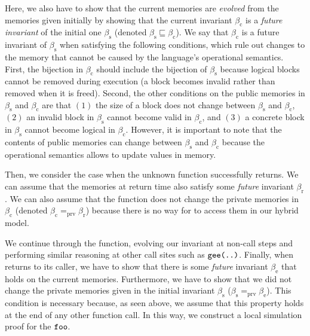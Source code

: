 Here, we also have to show that the current memories are
\emph{evolved} from the memories given initially by showing that the
current invariant $\beta_\textrm{c}$ is a \emph{future invariant} of
the initial one ${\beta_\textrm{s}}$ 
(denoted ${\beta_\textrm{s}}\sqsubseteq\beta_\textrm{c}$).
We say that $\beta_\textrm{c}$ is a future invariant of 
${\beta_\textrm{s}}$ when satisfying the following conditions,
which rule out changes to the memory that cannot be caused 
by the language's operational semantics.  
First, the bijection in
$\beta_\textrm{c}$ should include the bijection of ${\beta_\textrm{s}}$ because
logical blocks cannot be removed during execution (a block
becomes invalid rather than removed when it is freed).  Second, the other
conditions on the public memories in ${\beta_\textrm{s}}$ and
$\beta_\textrm{c}$ are that $(1)$ the size of a block does not change
between ${\beta_\textrm{s}}$ and $\beta_\textrm{c}$, $(2)$ an
invalid block in ${\beta_\textrm{s}}$ cannot become valid in
$\beta_\textrm{c}$, and $(3)$ a concrete block in
${\beta_\textrm{s}}$ cannot become logical in $\beta_\textrm{c}$.
However, it is important to note that the contents of public memories
can change between ${\beta_\textrm{s}}$ and $\beta_\textrm{c}$ because
the operational semantics allows
to update values in memory.

Then, we consider the case when the unknown function successfully
returns. We can assume that the memories at return time also satisfy some
\emph{future} invariant ${\beta_\textrm{r}}$. We can also
assume that the function  does not change the private
memories in $\beta_\textrm{c}$ (denoted $\beta_\textrm{c}
=_{\textrm{prv}} {\beta_\textrm{r}}$) because there is no way
for  to access them in our hybrid model.

We continue through the function, evolving our invariant at non-call steps and performing similar reasoning at other call sites
such as $\texttt{gee(..)}$.  Finally, when  returns to its caller, we have to
show that there is some \emph{future} invariant $\beta_\textrm{e}$
that holds on the current memories. Furthermore, we have to show that
we did not change the private memories given in
 the initial invariant $\beta_\textrm{s}$ (\ie $\beta_\textrm{s} =_{\textrm{prv}}
\beta_\textrm{e}$). This condition is necessary because, as seen above, we assume that this property holds at the end of any other function call.
In this way, we construct a local simulation proof for the $\texttt{foo}$.



